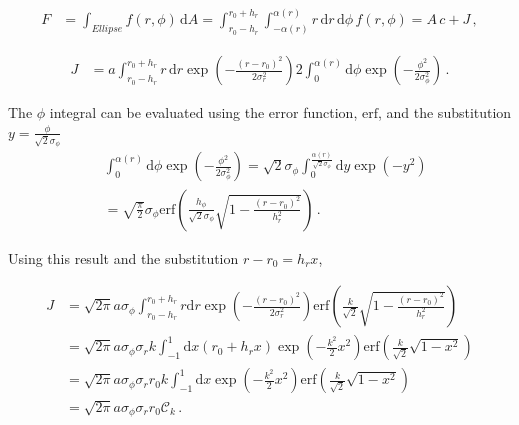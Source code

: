 \documentclass[a4paper]{scrartcl}
\begin{document}
\begin{align}
  F & = \int_{Ellipse} f(r, \phi) \, \mathrm{d}A                                                
    = \int_{r_0 - h_r}^{r_0 + h_r} \int_{-\alpha(r)}^{\alpha(r)} r \,\mathrm{d}r \, \mathrm{d}\phi \,f(r, \phi)
    = A \,c + J \,,
\end{align}

\begin{align}
  J & = a \int_{r_0 - h_r}^{r_0 + h_r} r \,\mathrm{d}r \exp\left( - \frac{(r-r_0)^2}{2 \sigma_r^2} \right)
  2 \int_0^{\alpha(r)} \mathrm{d}\phi \exp\left( - \frac{\phi^2}{2\sigma_\phi^2} \right)   \,.
\end{align}

The $\phi$ integral can be evaluated using the error function, $\mathrm{erf}$, and the substitution
$y = \frac{\phi}{\sqrt{2} \sigma_\phi}$
\begin{align}
   & \int_0^{\alpha(r)} \mathrm{d} \phi \exp\left( - \frac{\phi^2}{2\sigma_\phi^2} \right)
  = \sqrt{2} \sigma_\phi \int_0^{\frac{\alpha(r)}{\sqrt{2} \sigma_\phi}} \mathrm{d}y \exp(-y^2)                                            \\
   & = \sqrt{\frac{\pi}{2}} \sigma_\phi \mathrm{erf} \left( \frac{h_\phi}{\sqrt{2} \sigma_\phi} \sqrt{1 - \frac{(r-r_0)^2}{h_r^2}} \right) \,.
\end{align}

Using this result and the substitution $r - r_0 = h_r x$,

\begin{align}
  J & = \sqrt{2\pi} a \sigma_\phi \int_{r_0 - h_r}^{r_0 + h_r} r \mathrm{d}r \exp\left( - \frac{(r-r_0)^2}{2 \sigma_r^2}\right)
  \mathrm{erf} \left( \frac{k}{\sqrt{2}} \sqrt{1 - \frac{(r-r_0)^2}{h_r^2}} \right)                                             \\
    & = \sqrt{2\pi} a \sigma_\phi \sigma_r k \int_{-1}^{1} \mathrm{d}x (r_0 + h_r x)  \exp\left( - \frac{k^2}{2} x^2\right)
  \mathrm{erf} \left( \frac{k}{\sqrt{2}} \sqrt{1 - x^2} \right)                                                                 \\
    & = \sqrt{2\pi} a \sigma_\phi \sigma_r r_0 k \int_{-1}^{1} \mathrm{d}x \exp\left( - \frac{k^2}{2} x^2\right)
  \mathrm{erf} \left( \frac{k}{\sqrt{2}} \sqrt{1 - x^2} \right)                                                                 \\
    & = \sqrt{2\pi} a \sigma_\phi \sigma_r r_0 \mathcal{C}_k \,.
\end{align}
\end{document}
